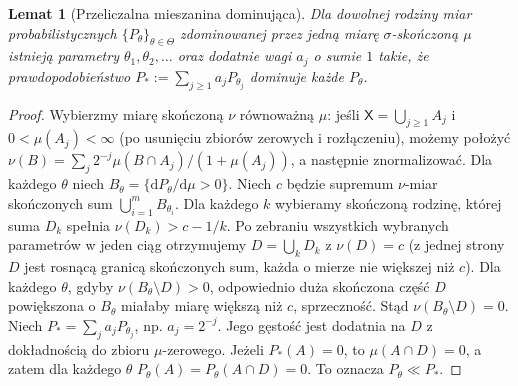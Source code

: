 \documentclass[11pt,a4paper,oneside]{report}
\numberwithin{equation}{chapter}
\theoremstyle{plain}
\newtheorem{lemat}[twierdzenie]{Lemat}
\theoremstyle{definition}
\theoremstyle{remark}
\newcommand{\dd}{\mathrm d}
\begin{document}
\begin{lemat}[Przeliczalna mieszanina dominująca]\label{lem:halmos-savage}
Dla dowolnej rodziny miar probabilistycznych $\{P_\theta\}_{\theta\in\Theta}$
zdominowanej przez jedną miarę $\sigma$-skończoną $\mu$
istnieją parametry $\theta_1,\theta_2,\ldots$ oraz dodatnie wagi
$a_j$ o sumie $1$ takie, że prawdopodobieństwo
$P_*:=\sum_{j\ge1}a_jP_{\theta_j}$ dominuje każde $P_\theta$.
\end{lemat}
\begin{proof}
Wybierzmy miarę skończoną $\nu$ równoważną $\mu$: jeśli
$\mathsf X=\bigcup_{j\ge1}A_j$ i $0<\mu(A_j)<\infty$
(po usunięciu zbiorów zerowych i rozłączeniu), możemy położyć
$\nu(B)=\sum_j2^{-j}\mu(B\cap A_j)/(1+\mu(A_j))$,
a następnie znormalizować. Dla każdego $\theta$ niech
$B_\theta=\{\dd P_\theta/\dd\mu>0\}$.
Niech $c$ będzie supremum $\nu$-miar skończonych sum
$\bigcup_{i=1}^m B_{\theta_i}$. Dla każdego $k$ wybieramy
skończoną rodzinę, której suma $D_k$ spełnia
$\nu(D_k)>c-1/k$. Po zebraniu wszystkich wybranych parametrów
w jeden ciąg otrzymujemy $D=\bigcup_kD_k$ z $\nu(D)=c$
(z jednej strony $D$ jest rosnącą granicą skończonych sum,
każda o mierze nie większej niż $c$). Dla każdego $\theta$,
gdyby $\nu(B_\theta\setminus D)>0$, odpowiednio duża skończona
część $D$ powiększona o $B_\theta$ miałaby miarę większą niż $c$,
sprzeczność. Stąd $\nu(B_\theta\setminus D)=0$.
Niech $P_*=\sum_j a_jP_{\theta_j}$, np. $a_j=2^{-j}$.
Jego gęstość jest dodatnia na $D$ z dokładnością do zbioru
$\mu$-zerowego. Jeżeli $P_*(A)=0$, to
$\mu(A\cap D)=0$, a zatem dla każdego $\theta$
$P_\theta(A)=P_\theta(A\cap D)=0$. To oznacza $P_\theta\ll P_*$.
\end{proof}
\end{document}
